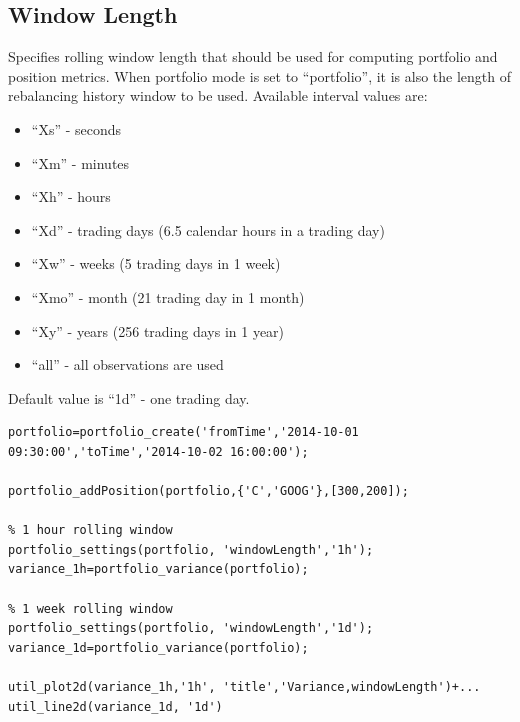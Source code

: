\documentclass[letterpaper]{report}
\begin{document}
\subsection{Window Length}
Specifies rolling window length that should be used for computing portfolio and position metrics. 
When portfolio mode is set to ``portfolio'', it is also the length of rebalancing history window to be used.
Available interval values are:
\begin{itemize} 
  \item ``Xs'' - seconds
  \item ``Xm'' - minutes
  \item ``Xh'' - hours
  \item ``Xd'' - trading days (6.5 calendar hours in a trading day)
  \item ``Xw'' - weeks (5 trading days in 1 week)
  \item ``Xmo'' - month (21 trading day in 1 month)
  \item ``Xy'' - years (256 trading days in 1 year)
  \item ``all'' - all observations are used
\end{itemize}
Default value is ``1d'' - one trading day.
\begin{lstlisting}
portfolio=portfolio_create('fromTime','2014-10-01 09:30:00','toTime','2014-10-02 16:00:00');

portfolio_addPosition(portfolio,{'C','GOOG'},[300,200]);

% 1 hour rolling window
portfolio_settings(portfolio, 'windowLength','1h');
variance_1h=portfolio_variance(portfolio);

% 1 week rolling window
portfolio_settings(portfolio, 'windowLength','1d');
variance_1d=portfolio_variance(portfolio);

util_plot2d(variance_1h,'1h', 'title','Variance,windowLength')+...
util_line2d(variance_1d, '1d')
\end{lstlisting}
\end{document}
